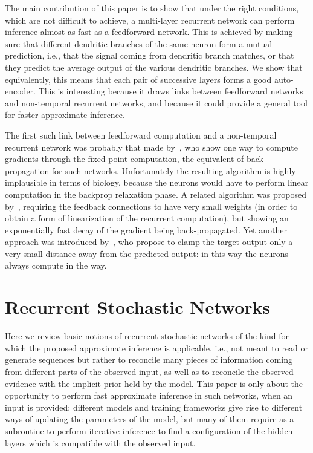 \documentclass{article}
\begin{document}
The main contribution of this paper is to show that under the right
conditions, which are not difficult to achieve, a multi-layer recurrent
network can perform inference almost as fast as a feedforward network.
This is achieved by making sure that different dendritic branches
of the same neuron form a mutual prediction, i.e., that the signal coming
from dendritic branch matches, or that they predict
the average output of the various dendritic branches. We show that equivalently, this means that
each pair of successive layers forms a good auto-encoder.
This is interesting because it draws links between feedforward
networks and non-temporal recurrent networks, and because it could provide a
general tool for faster approximate inference.

The first such link between feedforward computation and a non-temporal recurrent network
was probably that made by~\citet{Pineda87,Almeida87}, who show one way to compute gradients
  through the fixed point computation, the equivalent of back-propagation
  for such networks. Unfortunately the resulting algorithm is highly implausible in terms of biology,
  because the neurons would have to perform linear computation in the backprop relaxation phase.
  A related algorithm was proposed by~\cite{Xie+Seung-2003}, requiring the feedback connections
  to have very small weights (in order to obtain a form of linearization of the recurrent computation),
  but showing an exponentially fast decay of the gradient being back-propagated.
  Yet another approach was introduced by~\citet{Scellier+Bengio-arxiv2016}, who propose
  to clamp the target output only a very small distance away from the predicted output:
  in this way the neurons always compute in the way.

\section{Recurrent Stochastic Networks}

Here we review basic notions of recurrent stochastic networks of the kind
for which the proposed approximate inference is applicable, i.e., not meant
to read or generate sequences but rather to reconcile many pieces of information
coming from different parts of the observed input, as well as to reconcile
the observed evidence with the implicit prior held by the model. This paper
is only about the opportunity to perform fast approximate inference in such
networks, when an input is provided: different models and training
frameworks give rise to different ways of updating the parameters of the
model, but many of them require as a subroutine to perform iterative
inference to find a configuration of the hidden layers which is compatible
with the observed input.
\end{document}
